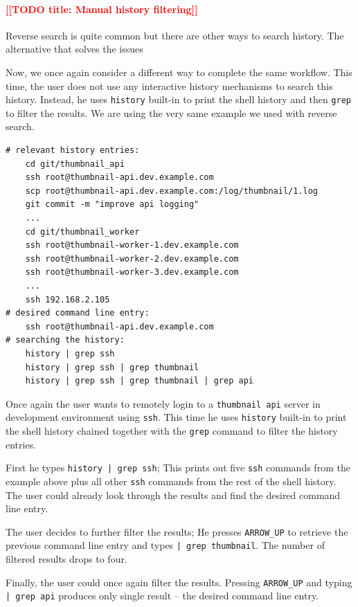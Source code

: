 \documentclass[thesis=M,english]{FITthesis}[2012/10/20]
\newcommand{\redtext}[1]{\textcolor{red}{[[#1]]}}
\begin{document}
\paragraph{\redtext{TODO title: Manual history filtering}}

Reverse search is quite common but there are other ways to search history. The alternative that solves the issues 

Now, we once again consider a different way to complete the same workflow. This time, the user does not use any interactive history mechanisms to search this history. Instead, he uses \verb|history| built-in to print the shell history and then \verb|grep| to filter the results. 
We are using the very same example we used with reverse search.

\begin{verbatim}
# relevant history entries:
    cd git/thumbnail_api
    ssh root@thumbnail-api.dev.example.com
    scp root@thumbnail-api.dev.example.com:/log/thumbnail/1.log
    git commit -m "improve api logging"
    ...
    cd git/thumbnail_worker
    ssh root@thumbnail-worker-1.dev.example.com
    ssh root@thumbnail-worker-2.dev.example.com
    ssh root@thumbnail-worker-3.dev.example.com
    ...
    ssh 192.168.2.105
# desired command line entry:
    ssh root@thumbnail-api.dev.example.com
# searching the history:
    history | grep ssh
    history | grep ssh | grep thumbnail
    history | grep ssh | grep thumbnail | grep api
\end{verbatim}

Once again the user wants to remotely login to a \verb|thumbnail api| server in development environment using \verb|ssh|. 
This time he uses \verb|history| built-in to print the shell history chained together with the \verb|grep| command to filter the history entries.

First he types \verb#history | grep ssh#; This prints out five \verb|ssh| commands from the example above plus all other \verb|ssh| commands from the rest of the shell history. The user could already look through the results and find the desired command line entry.

The user decides to further filter the results; He presses \verb|ARROW_UP| to retrieve the previous command line entry and types \verb#| grep thumbnail#. The number of filtered results drops to four. 

Finally, the user could once again filter the results. Pressing \verb|ARROW_UP| and typing \verb#| grep api# produces only single result -- the desired command line entry.
\end{document}

